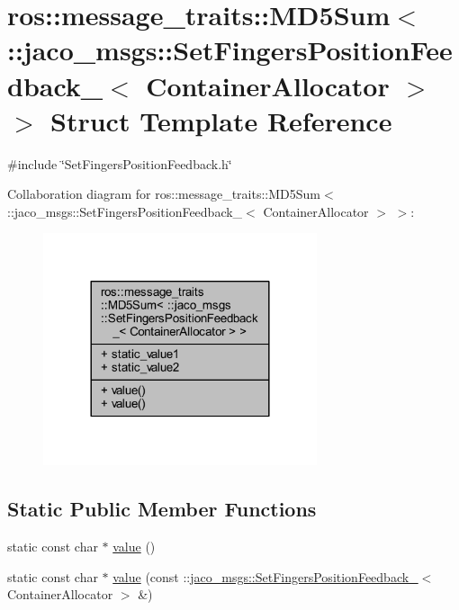 \hypertarget{structros_1_1message__traits_1_1MD5Sum_3_01_1_1jaco__msgs_1_1SetFingersPositionFeedback___3_01ContainerAllocator_01_4_01_4}{}\section{ros\+:\+:message\+\_\+traits\+:\+:M\+D5\+Sum$<$ \+:\+:jaco\+\_\+msgs\+:\+:Set\+Fingers\+Position\+Feedback\+\_\+$<$ Container\+Allocator $>$ $>$ Struct Template Reference}
\label{structros_1_1message__traits_1_1MD5Sum_3_01_1_1jaco__msgs_1_1SetFingersPositionFeedback___3_01ContainerAllocator_01_4_01_4}


{\ttfamily \#include \char`\"{}Set\+Fingers\+Position\+Feedback.\+h\char`\"{}}



Collaboration diagram for ros\+:\+:message\+\_\+traits\+:\+:M\+D5\+Sum$<$ \+:\+:jaco\+\_\+msgs\+:\+:Set\+Fingers\+Position\+Feedback\+\_\+$<$ Container\+Allocator $>$ $>$\+:
\nopagebreak
\begin{figure}[H]
\begin{center}
\leavevmode
\includegraphics[width=228pt]{d6/df5/structros_1_1message__traits_1_1MD5Sum_3_01_1_1jaco__msgs_1_1SetFingersPositionFeedback___3_01Co42ae3d5ef93317e7d21a4bd56fd12fc7}
\end{center}
\end{figure}
\subsection*{Static Public Member Functions}
\begin{DoxyCompactItemize}
\item 
static const char $\ast$ \hyperlink{structros_1_1message__traits_1_1MD5Sum_3_01_1_1jaco__msgs_1_1SetFingersPositionFeedback___3_01ContainerAllocator_01_4_01_4_adf91772dffbc926f270c7cb6957ad248}{value} ()
\item 
static const char $\ast$ \hyperlink{structros_1_1message__traits_1_1MD5Sum_3_01_1_1jaco__msgs_1_1SetFingersPositionFeedback___3_01ContainerAllocator_01_4_01_4_a6a1af0a96a569be1858a87f3f569e974}{value} (const \+::\hyperlink{structjaco__msgs_1_1SetFingersPositionFeedback__}{jaco\+\_\+msgs\+::\+Set\+Fingers\+Position\+Feedback\+\_\+}$<$ Container\+Allocator $>$ \&)
\end{DoxyCompactItemize}
